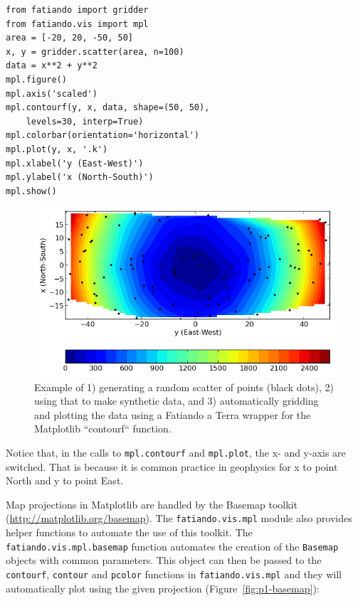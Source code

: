 \begin{verbatim}
from fatiando import gridder
from fatiando.vis import mpl
area = [-20, 20, -50, 50]
x, y = gridder.scatter(area, n=100)
data = x**2 + y**2
mpl.figure()
mpl.axis('scaled')
mpl.contourf(y, x, data, shape=(50, 50),
    levels=30, interp=True)
mpl.colorbar(orientation='horizontal')
mpl.plot(y, x, '.k')
mpl.xlabel('y (East-West)')
mpl.ylabel('x (North-South)')
mpl.show()
\end{verbatim}


\begin{figure}
    \centering
    \includegraphics[width=\textwidth]{figures/paper-fatiando/gridding_plotting_contourf}
    \caption{
    Example of 1) generating a random scatter of points (black dots),
    2) using that to make synthetic data, and
    3) automatically gridding and plotting the data using a
    Fatiando a Terra wrapper for the Matplotlib ``contourf``
    function.
    }
    \label{fig:p1-contourf}
\end{figure}


Notice that, in the calls to \texttt{mpl.contourf} and
\texttt{mpl.plot}, the x- and y-axis are switched. That is because it is
common practice in geophysics for x to point North and y to point East.

Map projections in Matplotlib are handled by the
Basemap toolkit (\url{http://matplotlib.org/basemap}). The
\texttt{fatiando.vis.mpl} module also provides helper functions to
automate the use of this toolkit. The \texttt{fatiando.vis.mpl.basemap}
function automates the creation of the \texttt{Basemap} objects with
common parameters. This object can then be passed to the
\texttt{contourf}, \texttt{contour} and \texttt{pcolor} functions in
\texttt{fatiando.vis.mpl} and they will automatically plot using the
given projection (Figure~\ref{fig:p1-basemap}):

